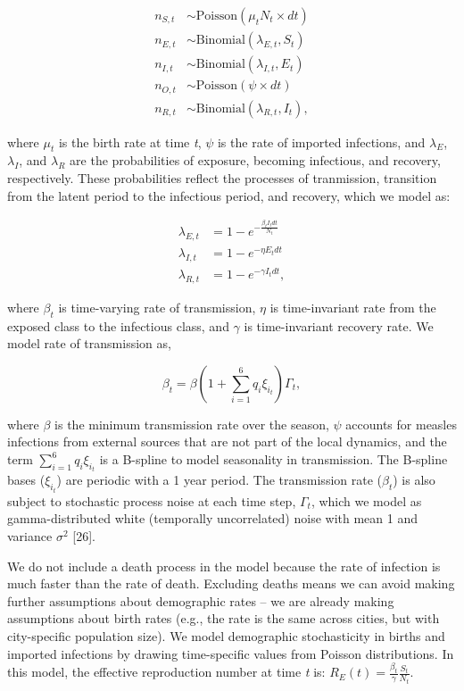 \documentclass[3p]{elsarticle} %
\begin{document}
\begin{align}
n_{S,t} &\sim \text{Poisson}(\mu_t N_t \times dt) \\
n_{E,t} &\sim \text{Binomial}(\lambda_{E,t}, S_{t}) \\
n_{I,t} &\sim \text{Binomial}(\lambda_{I,t}, E_{t}) \\
n_{O,t} &\sim \text{Poisson}(\psi \times dt) \\
n_{R,t} &\sim \text{Binomial}(\lambda_{R,t}, I_{t}),
\end{align}

\noindent{}where \(\mu_t\) is the birth rate at time \emph{t}, \(\psi\)
is the rate of imported infections, and \(\lambda_E\), \(\lambda_I\),
and \(\lambda_R\) are the probabilities of exposure, becoming
infectious, and recovery, respectively. These probabilities reflect the
processes of tranmission, transition from the latent period to the
infectious period, and recovery, which we model as:

\begin{align}
\lambda_{E,t} &= 1 - e^{-\frac{\beta_t I_t dt}{N_t}} \\
\lambda_{I,t} &= 1 - e^{-\eta E_{t} dt} \\
\lambda_{R,t} &= 1 - e^{-\gamma I_{t} dt},
\end{align}

\noindent{}where \(\beta_t\) is time-varying rate of transmission,
\(\eta\) is time-invariant rate from the exposed class to the infectious
class, and \(\gamma\) is time-invariant recovery rate. We model rate of
transmission as,

\begin{equation}
\beta_t = \beta \left(1 + \sum^6_{i=1} q_i \xi_{i_{t}} \right) \Gamma_t,
\end{equation}

\noindent{} where \(\beta\) is the minimum transmission rate over the
season, \(\psi\) accounts for measles infections from external sources
that are not part of the local dynamics, and the term
\(\sum^6_{i=1} q_i \xi_{i_{t}}\) is a B-spline to model seasonality in
transmission. The B-spline bases (\(\xi_{i_{t}}\)) are periodic with a 1
year period. The transmission rate (\(\beta_t\)) is also subject to
stochastic process noise at each time step, \(\Gamma_t\), which we model
as gamma-distributed white (temporally uncorrelated) noise with mean 1
and variance \(\sigma^2\) {[}26{]}.

We do not include a death process in the model because the rate of
infection is much faster than the rate of death. Excluding deaths means
we can avoid making further assumptions about demographic rates -- we
are already making assumptions about birth rates (e.g., the rate is the
same across cities, but with city-specific population size). We model
demographic stochasticity in births and imported infections by drawing
time-specific values from Poisson distributions. In this model, the
effective reproduction number at time \emph{t} is:
\(R_E(t) = \frac{\beta_t}{\gamma} \frac{S_t}{N_t}\).
\end{document}
